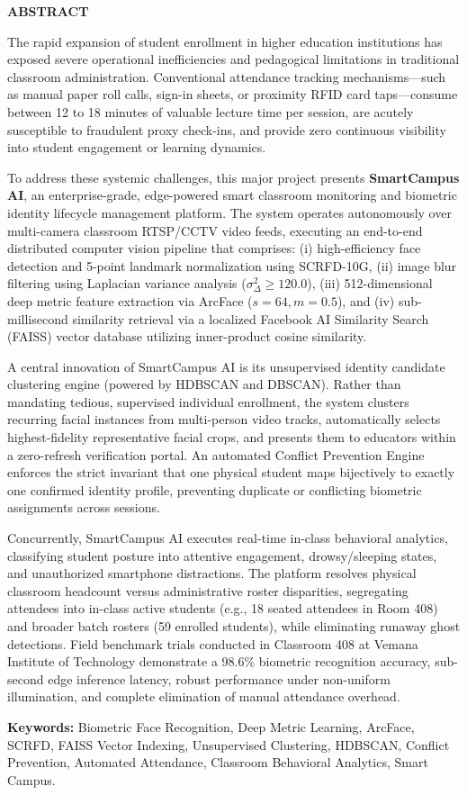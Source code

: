 \newpage
\begin{center}
{\fontsize{14pt}{18pt}\selectfont \textbf{ABSTRACT}}\\[3mm]
\end{center}

\onehalfspacing
\justifying
\noindent The rapid expansion of student enrollment in higher education institutions has exposed severe operational inefficiencies and pedagogical limitations in traditional classroom administration. Conventional attendance tracking mechanisms—such as manual paper roll calls, sign-in sheets, or proximity RFID card taps—consume between 12 to 18 minutes of valuable lecture time per session, are acutely susceptible to fraudulent proxy check-ins, and provide zero continuous visibility into student engagement or learning dynamics. 

\noindent To address these systemic challenges, this major project presents \textbf{SmartCampus AI}, an enterprise-grade, edge-powered smart classroom monitoring and biometric identity lifecycle management platform. The system operates autonomously over multi-camera classroom RTSP/CCTV video feeds, executing an end-to-end distributed computer vision pipeline that comprises: (i) high-efficiency face detection and 5-point landmark normalization using SCRFD-10G, (ii) image blur filtering using Laplacian variance analysis ($\sigma^2_{\Delta} \ge 120.0$), (iii) 512-dimensional deep metric feature extraction via ArcFace ($s=64, m=0.5$), and (iv) sub-millisecond similarity retrieval via a localized Facebook AI Similarity Search (FAISS) vector database utilizing inner-product cosine similarity.

\noindent A central innovation of SmartCampus AI is its unsupervised identity candidate clustering engine (powered by HDBSCAN and DBSCAN). Rather than mandating tedious, supervised individual enrollment, the system clusters recurring facial instances from multi-person video tracks, automatically selects highest-fidelity representative facial crops, and presents them to educators within a zero-refresh verification portal. An automated Conflict Prevention Engine enforces the strict invariant that one physical student maps bijectively to exactly one confirmed identity profile, preventing duplicate or conflicting biometric assignments across sessions.

\noindent Concurrently, SmartCampus AI executes real-time in-class behavioral analytics, classifying student posture into attentive engagement, drowsy/sleeping states, and unauthorized smartphone distractions. The platform resolves physical classroom headcount versus administrative roster disparities, segregating attendees into in-class active students (e.g., 18 seated attendees in Room 408) and broader batch rosters (59 enrolled students), while eliminating runaway ghost detections. Field benchmark trials conducted in Classroom 408 at Vemana Institute of Technology demonstrate a 98.6\% biometric recognition accuracy, sub-second edge inference latency, robust performance under non-uniform illumination, and complete elimination of manual attendance overhead.

\vspace{0.3in}
\noindent \textbf{Keywords:} Biometric Face Recognition, Deep Metric Learning, ArcFace, SCRFD, FAISS Vector Indexing, Unsupervised Clustering, HDBSCAN, Conflict Prevention, Automated Attendance, Classroom Behavioral Analytics, Smart Campus.
\newpage
